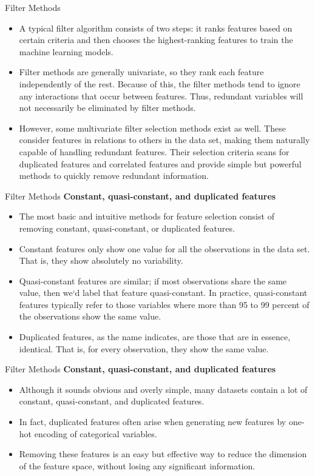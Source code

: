\documentclass[11pt]{beamer}
\begin{document}
%
%
\begin{frame}{Filter Methods}
	\begin{itemize}
		\item A typical filter algorithm consists of two steps: it ranks features based on certain criteria and then chooses the highest-ranking features to train the machine learning models.
		\item Filter methods are generally univariate, so they rank each feature independently of the rest. Because of this, the filter methods tend to ignore any interactions that occur between features. Thus, redundant variables will not necessarily be eliminated by filter methods.
		\item However, some multivariate filter selection methods exist as well. These consider features in relations to others in the data set, making them naturally capable of handling redundant features. Their selection criteria scans for duplicated features and correlated features and provide simple but powerful methods to quickly remove redundant information.
	\end{itemize}
\end{frame}
%
%
\begin{frame}{Filter Methods}
\textbf{Constant, quasi-constant, and duplicated features}
	\begin{itemize}
		\item The most basic and intuitive methods for feature selection consist of removing constant, quasi-constant, or duplicated features.
		\item Constant features only show one value for all the observations in the data set. That is, they show absolutely no variability.
		\item Quasi-constant features are similar; if most observations share the same value, then we`d label that feature quasi-constant. In practice, quasi-constant features typically refer to those variables where more than 95 to 99 percent of the observations show the same value.
		\item Duplicated features, as the name indicates, are those that are in essence, identical. That is, for every observation, they show the same value.
	\end{itemize}
\end{frame}
%
%
\begin{frame}{Filter Methods}
\textbf{Constant, quasi-constant, and duplicated features}
	\begin{itemize}
		\item Although it sounds obvious and overly simple, many datasets contain a lot of constant, quasi-constant, and duplicated features. 
		\item In fact, duplicated features often arise when generating new features by one-hot encoding of categorical variables. 
		\item Removing these features is an easy but effective way to reduce the dimension of the feature space, without losing any significant information.
	\end{itemize}
\end{frame}
\end{document}
